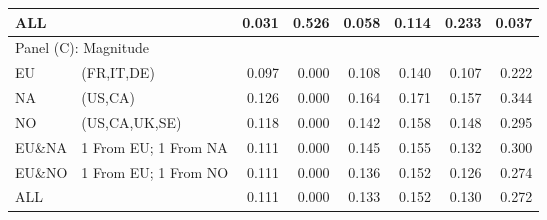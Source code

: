 \begin{table}
{\begin{tabular}{llrrrrrr}
		ALL    &                      & 0.031 & 0.526 & 0.058 & 0.114 & 0.233 & 0.037 \\ \hline
		\multicolumn{8}{l}{Panel (C): Magnitude}                                      \\ \hline
		EU     & (FR,IT,DE)           & 0.097 & 0.000 & 0.108 & 0.140 & 0.107 & 0.222 \\
		NA     & (US,CA)              & 0.126 & 0.000 & 0.164 & 0.171 & 0.157 & 0.344 \\
		NO     & (US,CA,UK,SE)        & 0.118 & 0.000 & 0.142 & 0.158 & 0.148 & 0.295 \\
		EU\&NA & 1 From EU; 1 From NA & 0.111 & 0.000 & 0.145 & 0.155 & 0.132 & 0.300 \\
		EU\&NO & 1 From EU; 1 From NO & 0.111 & 0.000 & 0.136 & 0.152 & 0.126 & 0.274 \\
		ALL    &                      & 0.111 & 0.000 & 0.133 & 0.152 & 0.130 & 0.272 \\ \hline\hline
	\end{tabular}}
\end{table}
